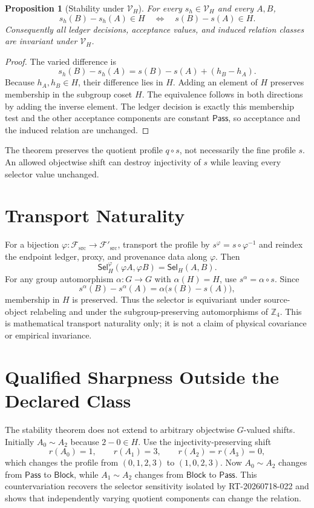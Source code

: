\documentclass[11pt]{article}
\newtheorem{proposition}{Proposition}
\newcommand{\Pass}{\mathsf{Pass}}
\newcommand{\Block}{\mathsf{Block}}
\newcommand{\Sel}{\mathsf{Sel}_{H}}
\newcommand{\Vary}{\mathcal V_H}
\begin{document}
\begin{proposition}[Stability under \(\Vary\)]
For every \(s_h\in\Vary\) and every \(A,B\),
\[
 s_h(B)-s_h(A)\in H
 \quad\Longleftrightarrow\quad
 s(B)-s(A)\in H.
\]
Consequently all ledger decisions, acceptance values, and induced relation
classes are invariant under \(\Vary\).
\end{proposition}

\begin{proof}
The varied difference is
\[
 s_h(B)-s_h(A)
 =s(B)-s(A)+(h_B-h_A).
\]
Because \(h_A,h_B\in H\), their difference lies in \(H\). Adding an element
of \(H\) preserves membership in the subgroup coset \(H\). The equivalence
follows in both directions by adding the inverse element. The ledger decision
is exactly this membership test and the other acceptance components are
constant \(\Pass\), so acceptance and the induced relation are unchanged.
\end{proof}

The theorem preserves the quotient profile \(q\circ s\), not necessarily the
fine profile \(s\). An allowed objectwise shift can destroy injectivity of
\(s\) while leaving every selector value unchanged.

\section{Transport Naturality}

For a bijection \(\varphi:\mathcal F_{\mathrm{src}}\to\mathcal F'_{\mathrm{src}}\),
transport the profile by
\(s^\varphi=s\circ\varphi^{-1}\) and reindex the endpoint ledger, proxy, and
provenance data along \(\varphi\). Then
\[
 \Sel^\varphi(\varphi A,\varphi B)=\Sel(A,B).
\]
For any group automorphism \(\alpha:G\to G\) with
\(\alpha(H)=H\), use \(s^\alpha=\alpha\circ s\). Since
\[
 s^\alpha(B)-s^\alpha(A)
 =\alpha\bigl(s(B)-s(A)\bigr),
\]
membership in \(H\) is preserved. Thus the selector is equivariant under
source-object relabeling and under the subgroup-preserving automorphisms of
\(\mathbb Z_4\). This is mathematical transport naturality only; it is not a
claim of physical covariance or empirical invariance.

\section{Qualified Sharpness Outside the Declared Class}

The stability theorem does not extend to arbitrary objectwise \(G\)-valued
shifts. Initially \(A_0\sim A_2\) because \(2-0\in H\). Use the
injectivity-preserving shift
\[
 r(A_0)=1,\qquad r(A_1)=3,\qquad r(A_2)=r(A_3)=0,
\]
which changes the profile from \((0,1,2,3)\) to \((1,0,2,3)\).
Now \(A_0\sim A_2\) changes from \(\Pass\) to \(\Block\), while
\(A_1\sim A_2\) changes from \(\Block\) to \(\Pass\). This
countervariation recovers the selector sensitivity isolated by
RT-20260718-022 and shows that independently varying quotient components can
change the relation.
\end{document}
